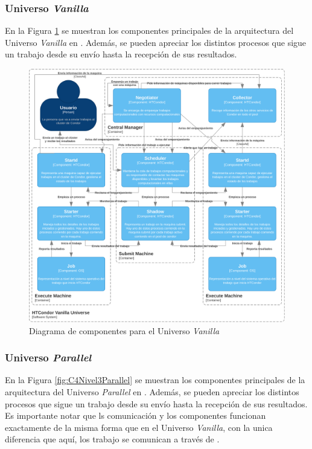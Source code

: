 \subsubsection{Universo \textit{Vanilla}}
\noindent
En la Figura \ref{fig:C4Nivel3Vanilla} se muestran los componentes principales de la arquitectura del Universo \textit{Vanilla} en \HTCondor. Además, se pueden apreciar los distintos procesos que sigue un trabajo desde su envío hasta la recepción de sus resultados.

\begin{figure}[H]
	\centering
	\includegraphics[scale=0.09]{tablas-images/C4/Diagramas HTCondor-Nivel 3 - Vanilla.drawio.png}
	\caption{Diagrama de componentes para el Universo \textit{Vanilla}}
    \label{fig:C4Nivel3Vanilla}
\end{figure}

\subsubsection{Universo \textit{Parallel}}
\noindent
En la Figura \ref{fig:C4Nivel3Parallel} se muestran los componentes principales de la arquitectura del Universo \textit{Parallel} en \HTCondor. Además, se pueden apreciar los distintos procesos que sigue un trabajo desde su envío hasta la recepción de sus resultados. Es importante notar que ls comunicación y los componentes funcionan exactamente de la misma forma que en el Universo \textit{Vanilla}, con la unica diferencia que aquí, los trabajo se comunican a través de \MPI.

